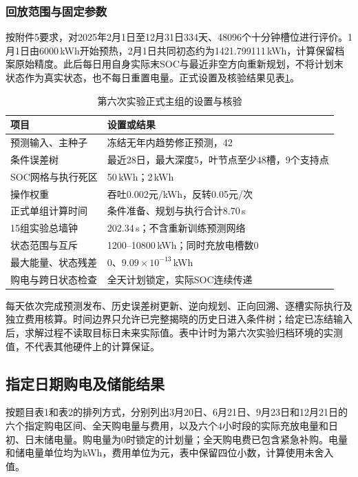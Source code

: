 \subsubsection{回放范围与固定参数}

按附件5要求，对2025年2月1日至12月31日334天、48096个十分钟槽位进行评价。1月1日由6000\,kWh开始预热，2月1日共同初态约为1421.799111\,kWh，计算保留档案原始精度。此后每日用自身实际末SOC与最近非空方向重新规划，不将计划末状态作为真实状态，也不每日重置电量。正式设置及核验结果见表\ref{tab:q2-setup}。

\begin{table}[htbp]
\centering\small
\caption{第六次实验正式主组的设置与核验}\label{tab:q2-setup}
\renewcommand{\arraystretch}{1.12}
\begin{tabularx}{\textwidth}{p{4.4cm}X}
\toprule
项目 & 设置或结果\\
\midrule
预测输入、主种子 & 冻结无年内趋势修正预测，42\\
条件误差树 & 最近28日，最大深度5，叶节点至少48槽，9个支持点\\
SOC网格与执行死区 & 50\,kWh；2\,kWh\\
操作权重 & 吞吐0.002元/kWh，反转0.05元/次\\
正式单组计算时间 & 条件准备、规划与执行合计8.70\,s\\
15组实验总墙钟 & 202.34\,s；不含重新训练预测网络\\
状态范围与互斥 & 1200--10800\,kWh；同时充放电槽数0\\
最大能量、状态残差 & 0、$9.09\times10^{-13}$\,kWh\\
购电与跨日状态检查 & 全天计划锁定，实际SOC连续传递\\
\bottomrule
\end{tabularx}
\end{table}

每天依次完成预测发布、历史误差树更新、逆向规划、正向回溯、逐槽实际执行及独立费用核算。时间边界只允许已完整揭晓的历史日进入条件树；给定已冻结输入后，求解过程不读取目标日未来实际值。表中计时为第六次实验归档环境的实测值，不代表其他硬件上的计算保证。

\subsection{指定日期购电及储能结果}

按题目表1和表2的排列方式，分别列出3月20日、6月21日、9月23日和12月21日的六个指定购电区间、全天购电量与费用，以及六个4小时段的实际充放电量和日初、日末储电量。购电量为0时锁定的计划量；全天购电费已包含紧急补购。电量和储电量单位均为kWh，费用单位为元，表中保留四位小数，计算使用未舍入值。

